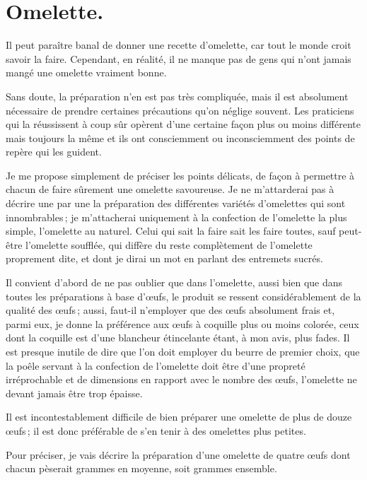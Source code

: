\section*{\centering Omelette.}

Il peut paraître banal de donner une recette d'omelette, car tout le monde croit
savoir la faire. Cependant, en réalité, il ne manque pas de gens qui n'ont jamais
mangé une omelette vraiment bonne.

Sans doute, la préparation n'en est pas très compliquée, mais il est absolument
nécessaire de prendre certaines précautions qu'on néglige souvent. Les
praticiens qui la réussissent à coup sûr opèrent d'une certaine façon plus ou
moins différente mais toujours la même et ils ont consciemment ou
inconsciemment des points de repère qui les guident.

Je me propose simplement de préciser les points délicats, de façon à permettre
à chacun de faire sûrement une omelette savoureuse. Je ne m'attarderai pas
à décrire une par une la préparation des différentes variétés d'omelettes qui
sont innombrables ; je m'attacherai uniquement à la confection de l'omelette la
plus simple, l'omelette au naturel. Celui qui sait la faire sait les faire
toutes, sauf peut-être l'omelette soufflée, qui diffère du reste complètement
de l'omelette proprement dite, et dont je dirai un mot en parlant des entremets
sucrés.

Il convient d'abord de ne pas oublier que dans l'omelette, aussi bien que dans
toutes les préparations à base d'œufs, le produit se ressent considérablement
de la qualité des œufs ; aussi, faut-il n'employer que des œufs absolument
frais et, parmi eux, je donne la préférence aux œufs à coquille plus ou moins
colorée, ceux dont la coquille est d'une blancheur étincelante étant, à mon
avis, plus fades. Il est presque inutile de dire que l'on doit employer du
beurre de premier choix, que la poêle servant à la confection de l’omelette
doit être d'une propreté irréprochable et de dimensions en rapport avec le
nombre des œufs, l'omelette ne devant jamais être trop épaisse.

Il est incontestablement difficile de bien préparer une omelette de plus de
douze œufs ; il est donc préférable de s'en tenir à des omelettes plus petites.

Pour préciser, je vais décrire la préparation d'une omelette de quatre œufs dont
chacun pèserait {\mmm} grammes en moyenne, soit {\mmm} grammes ensemble.

